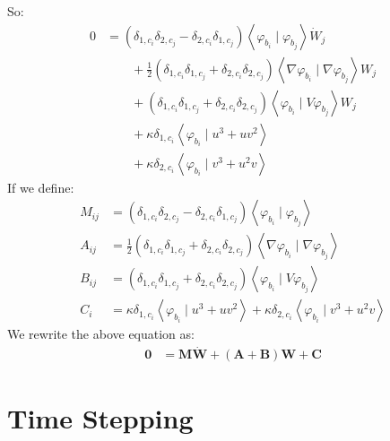 \documentclass{article}
\newcommand{\bvec}[1]{\boldsymbol{#1}}
\newcommand{\brvec}[1]{\mathbf{#1}}
\newcommand{\bmat}[1]{\boldsymbol{#1}}
\begin{document}
So:
\begin{align*}
    0 & = (\delta_{1, c_i} \delta_{2, c_j} - \delta_{2, c_i} \delta_{1, c_j})
            \left< \varphi_{b_i} \mid \varphi_{b_j} \right> \dot{W}_j \\
        & \qquad + \frac{1}{2} (\delta_{1, c_i} \delta_{1, c_j} + \delta_{2, c_i} \delta_{2, c_j})
            \left< \nabla \varphi_{b_i} \mid \nabla \varphi_{b_j} \right> W_j \\
        & \qquad + (\delta_{1, c_i} \delta_{1, c_j} + \delta_{2, c_i} \delta_{2, c_j})
            \left< \varphi_{b_i} \mid V \varphi_{b_j} \right> W_j \\
        & \qquad + \kappa \delta_{1, c_i} \left< \varphi_{b_i} \mid u^3 + u v^2 \right> \\
        & \qquad + \kappa \delta_{2, c_i} \left< \varphi_{b_i} \mid v^3 + u^2 v \right>
\end{align*}
\noindent If we define:
\begin{align*}
    M_{ij} & = (\delta_{1, c_i} \delta_{2, c_j} - \delta_{2, c_i} \delta_{1, c_j})
        \left< \varphi_{b_i} \mid \varphi_{b_j} \right> \\
    A_{ij} & = \frac{1}{2} (\delta_{1, c_i} \delta_{1, c_j} + \delta_{2, c_i} \delta_{2, c_j})
        \left< \nabla \varphi_{b_i} \mid \nabla \varphi_{b_j} \right> \\
    B_{ij} & = (\delta_{1, c_i} \delta_{1, c_j} + \delta_{2, c_i} \delta_{2, c_j})
        \left< \varphi_{b_i} \mid V \varphi_{b_j} \right> \\
    C_i & = \kappa \delta_{1, c_i} \left< \varphi_{b_i} \mid u^3 + u v^2 \right>
        + \kappa \delta_{2, c_i} \left< \varphi_{b_i} \mid v^3 + u^2 v \right>
\end{align*}
\noindent We rewrite the above equation as:
\begin{align*}
    \brvec{0} & = \bvec{M} \dot{\bvec{W}}
        + (\bmat{A} + \bmat{B}) \bvec{W}
        + \bvec{C}
\end{align*}

\newpage

\section{Time Stepping}
\end{document}

